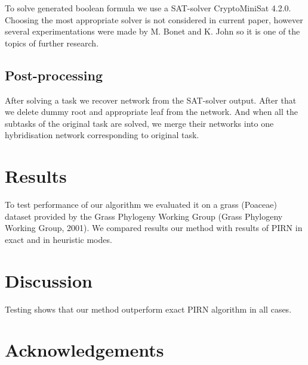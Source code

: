 \documentclass[runningheads, envcountsame, a4paper]{llncs}
\begin{document}
To solve generated boolean formula we use a SAT-solver CryptoMiniSat 4.2.0. Choosing the most appropriate solver 
is not considered in current paper, however several experimentations were made by M. Bonet and K. John \cite {bonet2009efficiently} 
so it is one of the topics of further research.

\subsection{Post-processing}

After solving a task we recover network from the SAT-solver output. After that we delete dummy root and appropriate 
leaf from the network. And when all the subtasks of the original task are solved, we merge their networks into one 
hybridisation network corresponding to original task.

\section{Results}

To test performance of our algorithm we evaluated it on a grass (Poaceae) dataset provided by the Grass Phylogeny Working Group 
(Grass Phylogeny Working Group, 2001). We compared results our method with results of PIRN in exact and in heuristic modes. 

\section{Discussion}

Testing shows that our method outperform exact PIRN algorithm in all cases.

\section*{Acknowledgements}



\clearpage
\end{document}
